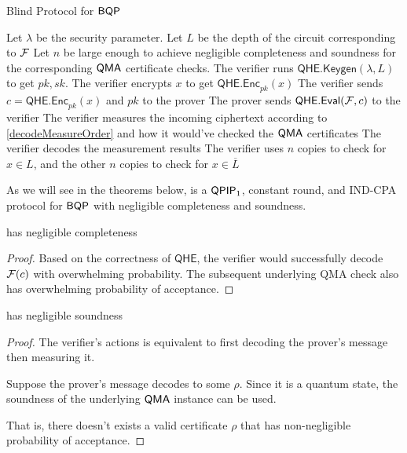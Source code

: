 \begin{algorithm}
	\caption{Blind Protocol for $\operatorname{\mathsf{BQP}}$}
	\label{proto:BlindBQP}
	\begin{algorithmic}[1]
		\State Let $\lambda$ be the security parameter.
		\State Let $L$ be the depth of the circuit corresponding to $\mathcal{F}$
		\State Let $n$ be large enough to achieve negligible completeness and soundness for the corresponding $\operatorname{\mathsf{QMA}}$ certificate checks.
		\State The verifier runs $\mathsf{QHE.Keygen}(\lambda, L)$ to get $pk, sk$.
		\State The verifier encrypts $x$ to get $\mathsf{QHE.Enc}_{pk}(x)$
		\State The verifier sends $c=\mathsf{QHE.Enc}_{pk}(x)$ and $pk$ to the prover
		\State The prover sends $\mathsf{QHE.Eval}(\mathcal{F}, c)$ to the verifier
		\State The verifier measures the incoming ciphertext according to \autoref{decodeMeasureOrder} and how it would've checked the $\operatorname{\mathsf{QMA}}$ certificates
		\State The verifier decodes the measurement results
		\State The verifier uses $n$ copies to check for $x\in L$, and the other $n$ copies to check for $x\in\overline{L}$
	\end{algorithmic}
\end{algorithm}

As we will see in the theorems below,  is a $\operatorname{\mathsf{QPIP}}_1$, constant round, and IND-CPA protocol for $\operatorname{\mathsf{BQP}}$ with negligible completeness and soundness.

\begin{thm}
	 has negligible completeness
\end{thm}
\begin{proof}
	Based on the correctness of $\mathsf{QHE}$, the verifier would successfully decode $\mathcal{F}(c)$ with overwhelming probability.
	The subsequent underlying QMA check also has overwhelming probability of acceptance.
\end{proof}

\begin{thm}
	 has negligible soundness
\end{thm}
\begin{proof}
	The verifier's actions is equivalent to first decoding the prover's message then measuring it.

	Suppose the prover's message decodes to some $\rho$. Since it is a quantum state, the soundness of the underlying $\operatorname{\mathsf{QMA}}$ instance can be used.
	
	That is, there doesn't exists a valid certificate $\rho$ that has non-negligible probability of acceptance.
\end{proof}

